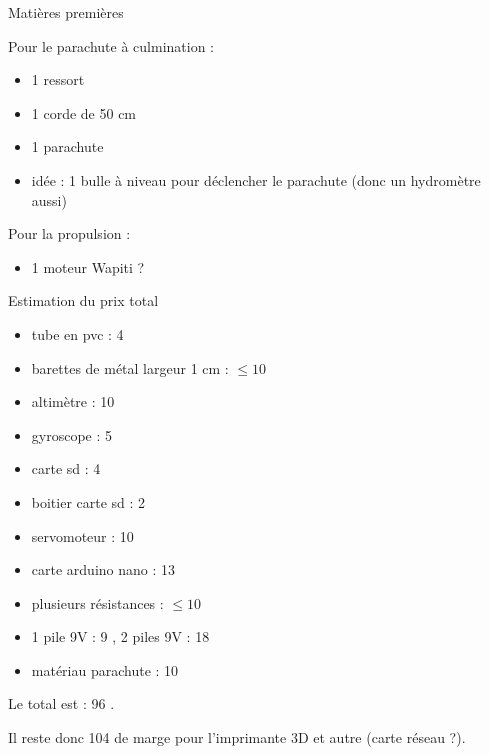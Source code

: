 \documentclass{beamer}
\begin{document}
	\begin{frame}{Matières premières}

		\fontsize{6}{12}\selectfont
		

                Pour le parachute à culmination :
                \begin{itemize}

                        \item 1 ressort
                        \item 1 corde de 50 cm
                        \item 1 parachute
                        \item idée : 1 bulle à niveau pour déclencher le parachute (donc un hydromètre aussi)
                \end{itemize}



                Pour la propulsion :

                \begin{itemize}

                        \item 1 moteur Wapiti ?
                \end{itemize}

	\end{frame}
	
	
	\begin{frame}{Estimation du prix total}
		
		\fontsize{6}{12}\selectfont

		\begin{itemize}

			\item tube en pvc : 4 \texteuro{}
			\item barettes de métal largeur 1 cm : $\leq 10$ \texteuro{}
			\item altimètre : 10 \texteuro{}
			\item gyroscope : 5 \texteuro{}
			\item carte sd : 4 \texteuro{}
			\item boitier carte sd : 2 \texteuro{}
			\item servomoteur : 10 \texteuro{}
			\item carte arduino nano : 13 \texteuro{}
			\item plusieurs résistances : $\leq 10$ \texteuro{}
			\item 1 pile 9V : 9 \texteuro{}, 2 piles 9V : 18 \texteuro{}
			\item matériau parachute : 10 \texteuro{}
		\end{itemize}


		Le total est : 96 \texteuro{}.


		Il reste donc 104 \texteuro{} de marge pour l'imprimante 3D et autre (carte réseau ?).
	\end{frame}
	

	\begin{frame}

		
	
		
	\end{frame}
\end{document}
